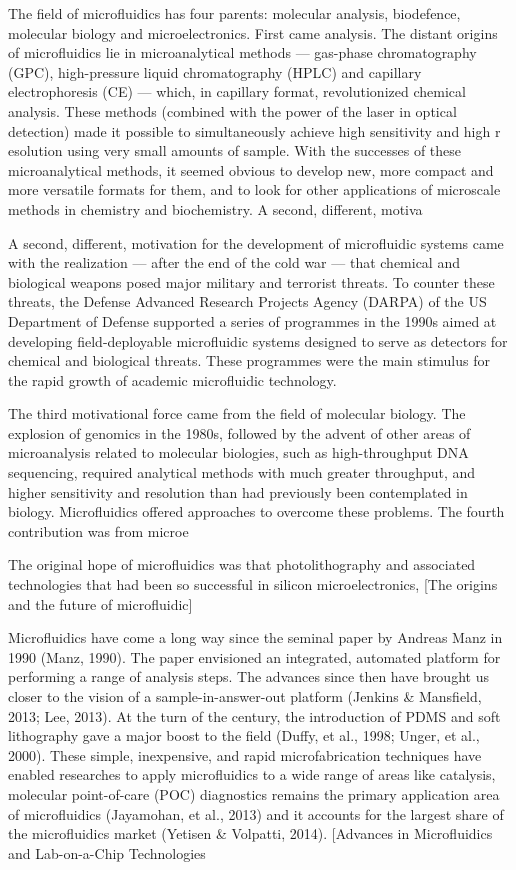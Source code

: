 The field of microfluidics has four parents: molecular analysis, biodefence, molecular biology and microelectronics. 
First came analysis. The distant origins of microfluidics lie in microanalytical methods — gas-phase chromatography (GPC), 
high-pressure liquid chromatography (HPLC) and capillary electrophoresis (CE) — which, in capillary format, revolutionized chemical analysis. These methods (combined with the power of the laser in optical detection) made it possible to simultaneously achieve high sensitivity and high r
esolution using very small amounts of sample. With the successes of these microanalytical methods, it seemed obvious to develop new, more compact and more versatile formats for them, and to look for other applications of microscale methods in chemistry and biochemistry. A second, different, motiva


A second, different, motivation for the development of microfluidic systems came with the realization — after the end of the cold war — that chemical and biological weapons posed major military and terrorist threats. To counter these threats, the Defense Advanced Research Projects Agency (DARPA)
 of the US Department of Defense supported a series of programmes in the 1990s aimed at developing field-deployable microfluidic systems designed to serve as detectors for chemical and biological threats. These programmes were the main stimulus for the rapid growth of academic microfluidic technology.

The third motivational force came from the field of molecular biology. The explosion of genomics in the 1980s, followed by the advent of other areas of microanalysis related to molecular biologies, such as high-throughput DNA sequencing, required analytical methods with much greater throughput, 
and higher sensitivity and resolution than had previously been contemplated in biology. Microfluidics offered approaches to overcome these problems. The fourth contribution was from microe


The original hope of microfluidics was that photolithography and associated 
technologies that had been so successful in silicon microelectronics,
[The origins and the future of microfluidic]

Microfluidics have come a long way since the seminal paper by Andreas Manz in 
1990 (Manz,   1990).   The   paper   envisioned   an   integrated,
   automated   platform   for performing a range of analysis steps. 
The advances since then have brought us closer to  the  vision  of  a  sample-in-answer-out  platform  (Jenkins  &  Mansfield,  2013;  Lee, 2013). At the turn of the century, the introduction of PDMS and soft lithography gave a  major  boost  to  the  field  (Duffy,  et  al.,  1998;  Unger,  et  al.,  
2000).  These  simple, inexpensive, and rapid microfabrication techniques have enabled researches to apply microfluidics  to  a  wide  range  of  areas  like  catalysis,  molecular  point-of-care  (POC) diagnostics remains the primary application area of microfluidics (Jayamohan, et al., 2013)  and  it  accounts  for  the  largest  share  of  the  microfluidics  market  (Yetisen  & Volpatti, 2014).
[Advances in Microfluidics and Lab-on-a-Chip Technologies


